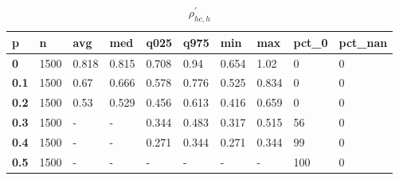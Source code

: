 \begin{table}[h]
 \centering 
\footnotesize
\caption{$\rho_{hc,h}^\prime $}
\label{tab:alphahch}
\begin{tabular}[h]{|l|l|l|l|l|l|l|l|l|l|
    } \hline
\textbf{ p} & \textbf{ n} & \textbf{ avg} & \textbf{ med} & \textbf{ q025} & \textbf{ q975} & \textbf{ min} & \textbf{ max} & \textbf{ pct\_0} & \textbf{ pct\_nan}
    \\ \hline
  \textbf{  0} & 1500 & 0.818 & 0.815 & 0.708 &  0.94 & 0.654 &  1.02 &   0 & 0
    \\ \hline
  \textbf{0.1} & 1500 &  0.67 & 0.666 & 0.578 & 0.776 & 0.525 & 0.834 &   0 & 0
    \\ \hline
  \textbf{0.2} & 1500 &  0.53 & 0.529 & 0.456 & 0.613 & 0.416 & 0.659 &   0 & 0
    \\ \hline
  \textbf{0.3} & 1500 & - & - & 0.344 & 0.483 & 0.317 & 0.515 &  56 & 0
    \\ \hline
  \textbf{0.4} & 1500 & - & - & 0.271 & 0.344 & 0.271 & 0.344 &  99 & 0
    \\ \hline
  \textbf{0.5} & 1500 & - & - & - & - & - & - & 100 & 0
    \\ \hline
 \end{tabular}
 \end{table}
